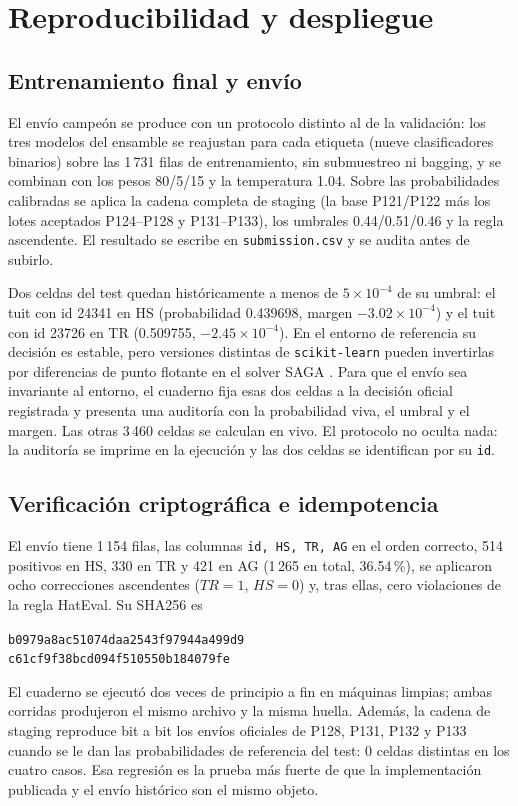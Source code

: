 \section{Reproducibilidad y despliegue}
\label{sec:reproducibilidad}

\subsection{Entrenamiento final y envío}

El envío campeón se produce con un protocolo distinto al de la validación: los
tres modelos del ensamble se reajustan para cada etiqueta (nueve clasificadores
binarios) sobre las 1\,731 filas de entrenamiento, sin submuestreo ni bagging, y
se combinan con los pesos 80/5/15 y la temperatura 1.04. Sobre las
probabilidades calibradas se aplica la cadena completa de staging (la base
P121/P122 más los lotes aceptados P124--P128 y P131--P133), los umbrales
0.44/0.51/0.46 y la regla ascendente. El resultado se escribe en
\texttt{submission.csv} y se audita antes de subirlo.

Dos celdas del test quedan históricamente a menos de $5\times10^{-4}$ de su
umbral: el tuit con id 24341 en HS (probabilidad 0.439698, margen
$-3.02\times10^{-4}$) y el tuit con id 23726 en TR (0.509755,
$-2.45\times10^{-4}$). En el entorno de
referencia su decisión es estable, pero versiones distintas de
\texttt{scikit-learn} pueden invertirlas por diferencias de punto flotante en
el solver SAGA \cite{defazio2014saga}. Para que el envío sea invariante al
entorno, el cuaderno fija esas dos celdas a la decisión oficial registrada y
presenta una auditoría con la probabilidad viva, el umbral y el margen. Las
otras 3\,460 celdas se calculan en vivo. El protocolo no oculta nada: la
auditoría se imprime en la ejecución y las dos celdas se identifican por su
\texttt{id}.

\subsection{Verificación criptográfica e idempotencia}

El envío tiene 1\,154 filas, las columnas \texttt{id, HS, TR, AG} en el orden
correcto, 514 positivos en HS, 330 en TR y 421 en AG (1\,265 en total,
36.54\,\%), se aplicaron ocho correcciones ascendentes ($TR=1$, $HS=0$) y,
tras ellas, cero violaciones de la regla HatEval. Su SHA256 es
\begin{center}
\texttt{\scriptsize b0979a8ac51074daa2543f97944a499d9}\\
\texttt{\scriptsize c61cf9f38bcd094f510550b184079fe}
\end{center}
El cuaderno se ejecutó dos veces de principio a fin en máquinas limpias; ambas
corridas produjeron el mismo archivo y la misma huella. Además, la cadena de
staging reproduce bit a bit los envíos oficiales de P128, P131, P132 y P133
cuando se le dan las probabilidades de referencia del test: 0 celdas
distintas en los cuatro casos. Esa regresión es la prueba más fuerte de que
la implementación publicada y el envío histórico son el mismo objeto.

